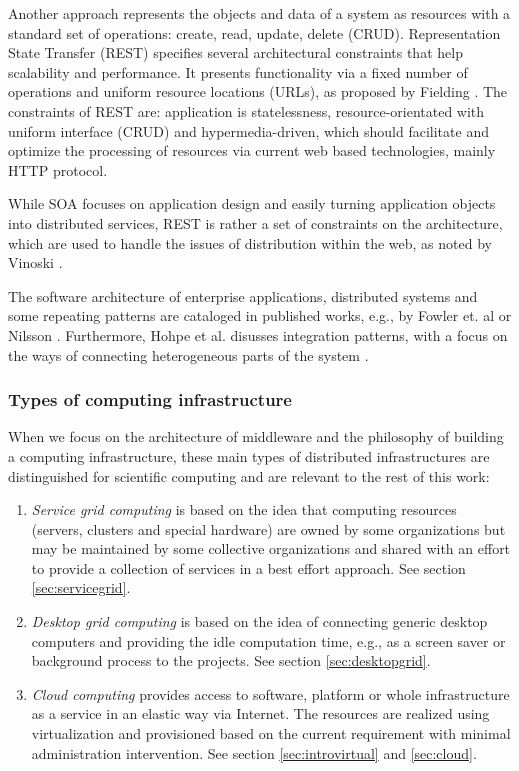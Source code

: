 Another approach represents the objects and data of a system as resources with a standard set of operations: create, read, update, delete (CRUD). Representation State Transfer (REST) specifies several architectural constraints that help scalability and performance. It presents functionality via a fixed number of operations and uniform resource locations (URLs), as proposed by Fielding \cite{fielding2000chapter}. The constraints of REST are:  application is statelessness, resource-orientated with uniform interface (CRUD) and hypermedia-driven, which should facilitate and optimize the processing of resources via current web based technologies, mainly HTTP protocol. 

While SOA focuses on application design and easily turning application objects into distributed services, REST is rather a set of constraints on the architecture, which are used to handle the issues of distribution within the web, as noted by Vinoski \cite{Vinoski2007}.

The software architecture of enterprise applications, distributed systems and some repeating patterns are cataloged in published works, e.g., by Fowler et. al\cite{Fowler2003} or Nilsson \cite{Nilsson2006}. Furthermore, Hohpe et al. disusses integration patterns, with a focus on the ways of connecting heterogeneous parts of the system \cite{Hohpe2002}.
\subsubsection{Types of computing infrastructure}
When we focus on the architecture of middleware and the philosophy of building a computing infrastructure, these main types of distributed infrastructures are distinguished for scientific computing and are relevant to the rest of this work:
\begin{enumerate}
\item{\emph{Service grid computing} is based on the idea that computing resources (servers, clusters and special hardware) are owned by some organizations but may be maintained by some collective organizations and shared with an effort to provide a collection of services in a best effort approach. See section \ref{sec:servicegrid}.}
\item{\emph{Desktop grid computing} is based on the idea of connecting generic desktop computers and providing the idle computation time, e.g., as a screen saver or background process to the projects. See section \ref{sec:desktopgrid}.}
\item{\emph{Cloud computing} provides access to software, platform or whole infrastructure as a service in an elastic way via Internet. The resources are realized using virtualization and provisioned based on the current requirement with minimal administration intervention. See section \ref{sec:introvirtual} and \ref{sec:cloud}.
}
\end{enumerate}

